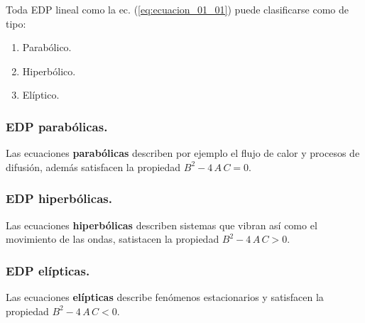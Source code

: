 \documentclass[12pt]{article}
\numberwithin{equation}{section}
\begin{document}
Toda EDP lineal como la ec. (\ref{eq:ecuacion_01_01}) puede clasificarse como de tipo:
\begin{enumerate}
\item Parabólico.
\item Hiperbólico.
\item Elíptico.
\end{enumerate}

\subsubsection{EDP parabólicas.}

Las ecuaciones \textbf{parabólicas} describen por ejemplo el flujo de calor y procesos de difusión, además satisfacen la propiedad $B^{2} - 4 \, A \, C = 0$.

\subsubsection{EDP hiperbólicas.}

Las ecuaciones \textbf{hiperbólicas} describen sistemas que vibran así como el movimiento de las ondas, satistacen la propiedad $B^{2} - 4 \, A \, C > 0$.

\subsubsection{EDP elípticas.}

Las ecuaciones \textbf{elípticas} describe fenómenos estacionarios y satisfacen la propiedad $B^{2} - 4 \, A \, C < 0$.
\end{document}
